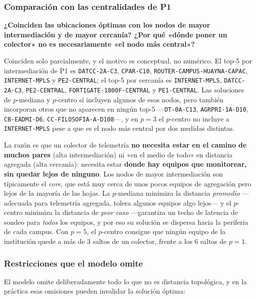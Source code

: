 \documentclass[10pt,a4paper]{extarticle}
\newcommand{\code}[1]{\texttt{\small #1}}
\begin{document}
\subsubsection{Comparación con las centralidades de P1}

\textbf{¿Coinciden las ubicaciones óptimas con los nodos de mayor intermediación y de mayor
cercanía? ¿Por qué «dónde poner un colector» no es necesariamente «el nodo más central»?}

Coinciden solo parcialmente, y el motivo es conceptual, no numérico. El top-5 por
intermediación de P1 es \code{DATCC-2A-C3}, \code{CPAR-C10},
\code{ROUTER-CAMPUS-HUAYNA-CAPAC}, \code{INTERNET-MPLS} y \code{PE2-CENTRAL}; el top-5 por
cercanía es \code{INTERNET-MPLS}, \code{DATCC-2A-C3}, \code{PE2-CENTRAL},
\code{FORTIGATE-1800F-CENTRAL} y \code{PE1-CENTRAL}. Las soluciones de $p$-mediana y
$p$-centro sí incluyen algunos de esos nodos, pero también incorporan otros que no aparecen
en ningún top-5 ---\code{DT-0A-C13}, \code{AGRPRI-1A-D10}, \code{CB-EADMI-D6},
\code{CC-FILOSOFIA-A-D108}---, y en $p=3$ el $p$-centro no incluye a \code{INTERNET-MPLS}
pese a que es el nodo más central por dos medidas distintas.

La razón es que un colector de telemetría \textbf{no necesita estar en el camino de muchos
pares} (alta intermediación) ni «en el medio de todo» en distancia agregada (alta cercanía):
necesita estar \textbf{donde hay equipos que monitorear, sin quedar lejos de ninguno}. Los
nodos de mayor intermediación son típicamente el \textit{core}, que está muy cerca de unos
pocos equipos de agregación pero lejos de la mayoría de las hojas. La $p$-mediana minimiza la
distancia \textit{promedio} ---adecuada para telemetría agregada, tolera algunos equipos
algo lejos--- y el $p$-centro minimiza la distancia de \textit{peor caso} ---garantiza un
techo de latencia de sondeo para \textit{todos} los equipos, y por eso su solución se
dispersa hacia la periferia de cada campus. Con $p=5$, el $p$-centro consigue que ningún
equipo de la institución quede a más de 3 saltos de un colector, frente a los 6 saltos de
$p=1$.

\subsubsection{Restricciones que el modelo omite}

El modelo omite deliberadamente todo lo que no es distancia topológica, y en la práctica esas
omisiones pueden invalidar la solución óptima:
\end{document}
